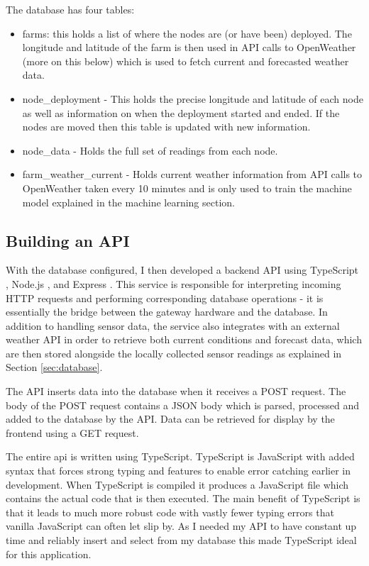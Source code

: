 The database has four tables:

\begin{itemize}
    \item farms: this holds a list of where the nodes are (or have been)
          deployed. The longitude and latitude of the farm is then used in API
          calls to OpenWeather (more on this below) which is used to fetch
          current and forecasted weather data.
    \item node\_deployment - This holds the precise longitude and latitude of
          each node as well as information on when the deployment started and
          ended. If the nodes are moved then this table is updated with new
          information.
    \item node\_data - Holds the full set of readings from each node.
    \item farm\_weather\_current - Holds current weather information from API
          calls to OpenWeather taken every 10 minutes and is only used to train
          the machine model explained in the machine learning section.
\end{itemize}


\subsection{Building an API}\label{sec:building-api}

With the database configured, I then developed a backend API using TypeScript
\cite{typescript}, Node.js \cite{nodejs}, and Express \cite{express}. This
service is responsible for interpreting incoming HTTP requests and performing
corresponding database operations - it is essentially the bridge between the
gateway hardware and the database. In addition to handling sensor data, the
service also integrates with an external weather API in order to retrieve both
current conditions and forecast data, which are then stored alongside the
locally collected sensor readings as explained in Section \ref{sec:database}.

The API inserts data into the database when it receives a POST request. The body
of the POST request contains a JSON body which is parsed, processed and added to
the database by the API. Data can be retrieved for display by the frontend using
a GET request.

The entire api is written using TypeScript. TypeScript is JavaScript with added
syntax that forces strong typing and features to enable error catching earlier
in development. When TypeScript is compiled it produces a JavaScript file which
contains the actual code that is then executed. The main benefit of TypeScript
is that it leads to much more robust code with vastly fewer typing errors that
vanilla JavaScript can often let slip by. As I needed my API to have constant up
time and reliably insert and select from my database this made TypeScript ideal
for this application.


